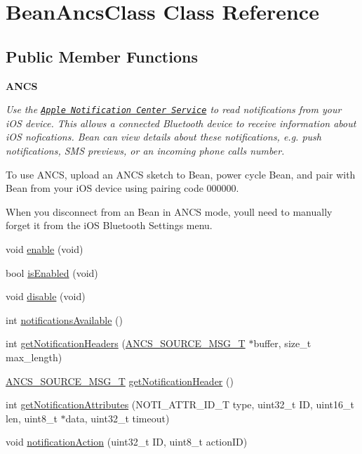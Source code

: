 \hypertarget{class_bean_ancs_class}{}\section{Bean\+Ancs\+Class Class Reference}
\label{class_bean_ancs_class}
\subsection*{Public Member Functions}
\begin{Indent}{\bf A\+N\+C\+S}\par
{\em Use the \href{https://developer.apple.com/library/ios/documentation/CoreBluetooth/Reference/AppleNotificationCenterServiceSpecification/Introduction/Introduction.html}{\tt Apple Notification Center Service} to read notifications from your i\+O\+S device. This allows a connected Bluetooth device to receive information about i\+O\+S nofications. Bean can view details about these notifications, e.\+g. push notifications, S\+M\+S previews, or an incoming phone call\textquotesingle{}s number.

To use A\+N\+C\+S, upload an A\+N\+C\+S sketch to Bean, power cycle Bean, and pair with Bean from your i\+O\+S device using pairing code 000000.

When you disconnect from an Bean in A\+N\+C\+S mode, you\textquotesingle{}ll need to manually forget it from the i\+O\+S Bluetooth Settings menu. }\begin{DoxyCompactItemize}
\item 
void \hyperlink{class_bean_ancs_class_aa3d157f0b796947032a27e6185be895a}{enable} (void)
\item 
bool \hyperlink{class_bean_ancs_class_a13833644884b8cc61e8d70ac850a500c}{is\+Enabled} (void)
\item 
void \hyperlink{class_bean_ancs_class_a5eff3ac01fb4248dace32c7a18d9d68e}{disable} (void)
\item 
int \hyperlink{class_bean_ancs_class_a29b6dc1d900b8c1dc93f40beaf29c8d9}{notifications\+Available} ()
\item 
int \hyperlink{class_bean_ancs_class_affaf3691b746468f5e11f78c9b74a755}{get\+Notification\+Headers} (\hyperlink{struct_a_n_c_s___s_o_u_r_c_e___m_s_g___t}{A\+N\+C\+S\+\_\+\+S\+O\+U\+R\+C\+E\+\_\+\+M\+S\+G\+\_\+\+T} $\ast$buffer, size\+\_\+t max\+\_\+length)
\item 
\hyperlink{struct_a_n_c_s___s_o_u_r_c_e___m_s_g___t}{A\+N\+C\+S\+\_\+\+S\+O\+U\+R\+C\+E\+\_\+\+M\+S\+G\+\_\+\+T} \hyperlink{class_bean_ancs_class_a8acff1decc559bc697e2757f5ebc12ee}{get\+Notification\+Header} ()
\item 
int \hyperlink{class_bean_ancs_class_ae0dc33b6e27d0ed37a345462ad58ba01}{get\+Notification\+Attributes} (N\+O\+T\+I\+\_\+\+A\+T\+T\+R\+\_\+\+I\+D\+\_\+\+T type, uint32\+\_\+t I\+D, uint16\+\_\+t len, uint8\+\_\+t $\ast$data, uint32\+\_\+t timeout)
\item 
void \hyperlink{class_bean_ancs_class_aa9ac67079e02d7fffc198d27854226c0}{notification\+Action} (uint32\+\_\+t I\+D, uint8\+\_\+t action\+I\+D)
\end{DoxyCompactItemize}
\end{Indent}


